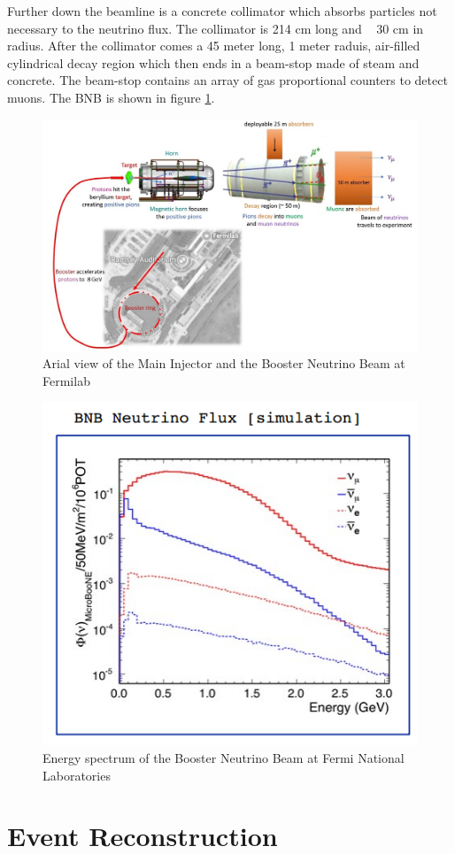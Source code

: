 Further down the beamline is a concrete collimator which absorbs particles not necessary to the neutrino flux. The collimator is 214 cm long and ~ 30 cm in radius. After the collimator comes a 45 meter long, 1 meter raduis, air-filled cylindrical decay region which then ends in a beam-stop made of steam and concrete. The beam-stop contains an array of gas proportional counters to detect muons. The BNB is shown in figure \ref{fig:bnb}.      

\begin{figure}[htp!]
\centering
\includegraphics[width=\textwidth]{figs/BNB_layout.jpg}
\caption{Arial view of the Main Injector and the Booster Neutrino Beam at Fermilab}
\label{fig:bnb}
\end{figure}



\begin{figure}[htp!]
\centering
\includegraphics[width=\textwidth]{figs/bnbflux.png}
\caption{Energy spectrum of the Booster Neutrino Beam at Fermi National Laboratories}
\label{fig:bnbflux}
\end{figure}

\section{Event Reconstruction}
